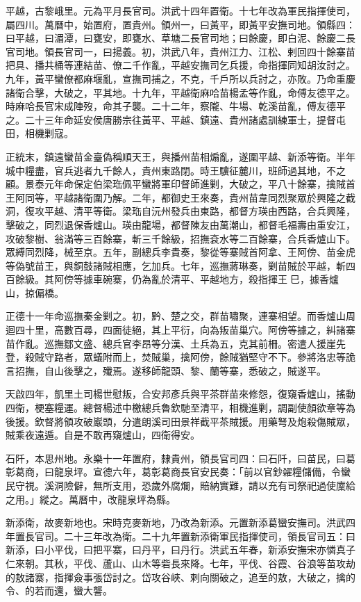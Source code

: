 \begin{pinyinscope}
平越，古黎峨里。元為平月長官司。洪武十四年置衛。十七年改為軍民指揮使司，屬四川。萬曆中，始置府，置貴州。領州一，曰黃平，即黃平安撫司地。領縣四：曰平越，曰湄潭，曰甕安，即甕水、草塘二長官司地；曰餘慶，即白泥、餘慶二長官司地。領長官司一，曰揚義。初，洪武八年，貴州江力、江松、剌回四十餘寨苗把具、播共桶等連結苗、僚二千作亂，平越安撫司乞兵援，命指揮同知胡汝討之。九年，黃平蠻僚都麻堰亂，宣撫司捕之，不克，千戶所以兵討之，亦敗。乃命重慶諸衛合擊，大破之，平其地。十九年，平越衛麻哈苗楊孟等作亂，命傅友德平之。時麻哈長官宋成陣歿，命其子襲。二十二年，察隴、牛場、乾溪苗亂，傅友德平之。二十三年命延安侯唐勝宗往黃平、平越、鎮遠、貴州諸處訓練軍士，提督屯田，相機剿寇。

正統末，鎮遠蠻苗金臺偽稱順天王，與播州苗相煽亂，遂圍平越、新添等衛。半年城中糧盡，官兵逃者九千餘人，貴州東路閉。時王驥征麓川，班師過其地，不之顧。景泰元年命保定伯梁珤佩平蠻將軍印督師進剿，大破之，平八十餘寨，擒賊首王阿同等，平越諸衛圍乃解。二年，都御史王來奏，貴州苗韋同烈聚眾於興隆之截洞，復攻平越、清平等衛。梁珤自沅州發兵由東路，都督方瑛由西路，合兵興隆，擊破之，同烈退保香爐山。瑛由龍場，都督陳友由萬潮山，都督毛福壽由重安江，攻破黎樹、翁滿等三百餘寨，斬三千餘級，招撫袞水等二百餘寨，合兵香爐山下。眾縛同烈降，械至京。五年，副總兵李貴奏，黎從等寨賊首阿拿、王阿傍、苗金虎等偽號苗王，與銅鼓諸賊相應，乞加兵。七年，巡撫蔣琳奏，剿苗賊於平越，斬四百餘級。其阿傍等據車碗寨，仍為亂於清平、平越地方，殺指揮王巳，據香爐山，掠偏橋。

正德十一年命巡撫秦金剿之。初，黔、楚之交，群苗嘯聚，連寨相望。而香爐山周迴四十里，高數百尋，四面徒絕，其上平衍，向為叛苗巢穴。阿傍等據之，糾諸寨苗作亂。巡撫鄒文盛、總兵官李昂等分漢、土兵為五，克其前柵。密遣人援崖先登，殺賊守路者，眾蟻附而上，焚賊巢，擒阿傍，餘賊猶堅守不下。參將洛忠等詭言招撫，自山後擊之，殲焉。遂移師龍頭、黎、蘭等寨，悉破之，賊遂平。

天啟四年，凱里土司楊世慰叛，合安邦彥兵與平茶群苗來修怨，復窺香爐山，搖動四衛，梗塞糧運。總督楊述中檄總兵魯欽馳至清平，相機進剿，調副使顏欲章等為後援。欽督將領攻破巖頭，分遣朗溪司田景祥截平茶賊援。用藥弩及炮殺傷賊眾，賊乘夜遠遁。自是不敢再窺爐山，四衛得安。

石阡，本思州地。永樂十一年置府，隸貴州，領長官司四：曰石阡，曰苗民，曰葛彰葛商，曰龍泉坪。宣德六年，葛彰葛商長官安民奏：「前以官鈔糴糧儲備，令蠻民守視。溪洞險僻，無所支用，恐歲外腐爛，賠納實難，請以充有司祭祀過使廩給之用。」縱之。萬曆中，改龍泉坪為縣。

新添衛，故麥新地也。宋時克麥新地，乃改為新添。元置新添葛蠻安撫司。洪武四年置長官司。二十三年改為衛。二十九年置新添衛軍民指揮使司，領長官司五：曰新添，曰小平伐，曰把平寨，曰丹平，曰丹行。洪武五年春，新添安撫宋亦憐真子仁來朝。其秋，平伐、蘆山、山木等砦長來降。七年，平伐、谷霞、谷浪等苗攻劫的敖諸寨，指揮僉事張岱討之。岱攻谷峽、剌向關破之，追至的敖，大破之，擒的令、的若而還，蠻大讋。


\end{pinyinscope}
